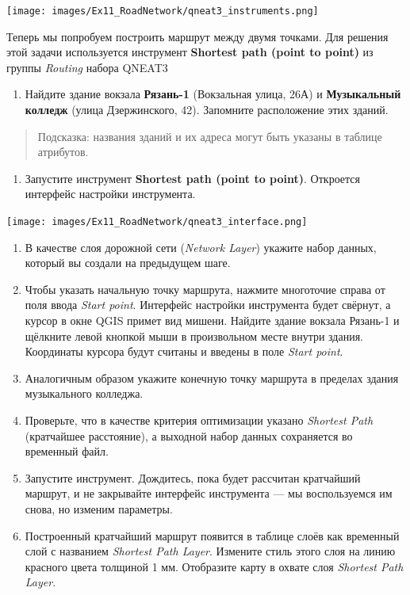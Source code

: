 \documentclass[
  12pt,
]{book}
\providecommand{\tightlist}{%
  \setlength{\itemsep}{0pt}\setlength{\parskip}{0pt}}
\begin{document}
\texttt{[image: images/Ex11\_RoadNetwork/qneat3\_instruments.png]}

Теперь мы попробуем построить маршрут между двумя точками. Для решения этой задачи используется инструмент \textbf{Shortest path (point to point)} из группы \emph{Routing} набора QNEAT3

\begin{enumerate}
\def\labelenumi{\arabic{enumi}.}
\setcounter{enumi}{2}
\tightlist
\item
  Найдите здание вокзала \textbf{Рязань-1} (Вокзальная улица, 26А) и \textbf{Музыкальный колледж} (улица Дзержинского, 42). Запомните расположение этих зданий.
\end{enumerate}

\begin{quote}
Подсказка: названия зданий и их адреса могут быть указаны в таблице атрибутов.
\end{quote}

\begin{enumerate}
\def\labelenumi{\arabic{enumi}.}
\setcounter{enumi}{3}
\tightlist
\item
  Запустите инструмент \textbf{Shortest path (point to point)}. Откроется интерфейс настройки инструмента.
\end{enumerate}

\texttt{[image: images/Ex11\_RoadNetwork/qneat3\_interface.png]}

\begin{enumerate}
\def\labelenumi{\arabic{enumi}.}
\setcounter{enumi}{4}
\item
  В качестве слоя дорожной сети (\emph{Network Layer}) укажите набор данных, который вы создали на предыдущем шаге.
\item
  Чтобы указать начальную точку маршрута, нажмите многоточие справа от поля ввода \emph{Start point}. Интерфейс настройки инструмента будет свёрнут, а курсор в окне QGIS примет вид мишени. Найдите здание вокзала Рязань-1 и щёлкните левой кнопкой мыши в произвольном месте внутри здания. Координаты курсора будут считаны и введены в поле \emph{Start point}.
\item
  Аналогичным образом укажите конечную точку маршрута в пределах здания музыкального колледжа.
\item
  Проверьте, что в качестве критерия оптимизации указано \emph{Shortest Path} (кратчайшее расстояние), а выходной набор данных сохраняется во временный файл.
\item
  Запустите инструмент. Дождитесь, пока будет рассчитан кратчайший маршрут, и не закрывайте интерфейс инструмента --- мы воспользуемся им снова, но изменим параметры.
\item
  Построенный кратчайший маршрут появится в таблице слоёв как временный слой с названием \emph{Shortest Path Layer}. Измените стиль этого слоя на линию красного цвета толщиной 1 мм. Отобразите карту в охвате слоя \emph{Shortest Path Layer}.
\end{enumerate}
\end{document}
